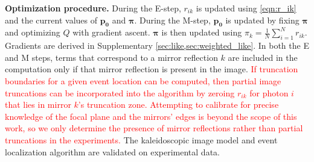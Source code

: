 \noindent
\textbf{Optimization procedure.}
During the E-step, $r_{ik}$ is updated using \cref{eqn:r_ik} and the current 
values of $\bm{p_0}$ and $\bm{\pi}$.
During the M-step, $\bm{p_0}$ is updated by fixing $\bm{\pi}$ and optimizing 
$Q$ with gradient ascent. 
$\bm{\pi}$ is then updated using $\pi_k=\frac{1}{N}\sum_{i=1}^N r_{ik}$.
Gradients are derived in Supplementary \cref*{sec:like,sec:weighted_like}.
In both the E and M steps, terms that correspond to a mirror reflection $k$ are 
included in the computation only if that mirror reflection is present in the image.
\textcolor{red}{
If truncation boundaries for a given event location can be computed, then partial 
image truncations can be incorporated into the algorithm by zeroing $r_{ik}$ for 
photon $i$ that lies in mirror $k$'s truncation zone.
Attempting to calibrate for precise knowledge of the focal plane and the mirrors' 
edges is beyond the scope of this work,
so we only determine the presence of mirror reflections rather than partial 
truncations in the experiments.}
The kaleidoscopic image model and event localization algorithm are validated on 
experimental data.